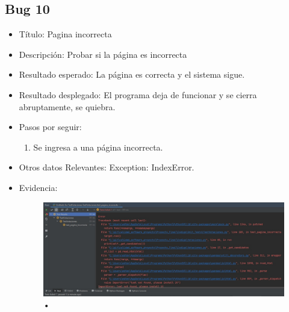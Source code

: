\documentclass[conference]{IEEEtran}
\begin{document}
\subsection*{Bug 10}
\begin{itemize}
\item Título: Pagina incorrecta

\item Descripción: Probar si la página es incorrecta

\item Resultado esperado: La página es correcta y el sistema sigue.

\item Resultado desplegado: El programa deja de funcionar y se cierra abruptamente, se quiebra. 

\item Pasos por seguir: 
\begin{enumerate}
\item Se ingresa a una página incorrecta.
\end{enumerate}
\item Otros datos Relevantes: Exception: IndexError.
\item Evidencia:
\begin{figure}[H]
\centering
\includegraphics[scale=0.2]{imagenes/Pagina_incorrecta.jpeg}
\caption{•}
\end{figure}

\end{itemize}
\end{document}
